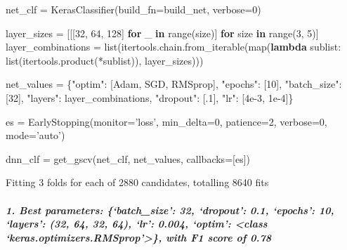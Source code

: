 \documentclass[]{article}
\newenvironment{Shaded}{}{}
\newcommand{\BuiltInTok}[1]{#1}
\newcommand{\ControlFlowTok}[1]{\textcolor[rgb]{0.00,0.44,0.13}{\textbf{#1}}}
\newcommand{\DecValTok}[1]{\textcolor[rgb]{0.25,0.63,0.44}{#1}}
\newcommand{\FloatTok}[1]{\textcolor[rgb]{0.25,0.63,0.44}{#1}}
\newcommand{\KeywordTok}[1]{\textcolor[rgb]{0.00,0.44,0.13}{\textbf{#1}}}
\newcommand{\NormalTok}[1]{#1}
\newcommand{\OperatorTok}[1]{\textcolor[rgb]{0.40,0.40,0.40}{#1}}
\newcommand{\StringTok}[1]{\textcolor[rgb]{0.25,0.44,0.63}{#1}}
\let\oldsubparagraph\subparagraph
\renewcommand{\subparagraph}[1]{\oldsubparagraph{#1}\mbox{}}
\begin{document}
\begin{Shaded}
\begin{Highlighting}[]
\NormalTok{net_clf }\OperatorTok{=}\NormalTok{ KerasClassifier(build_fn}\OperatorTok{=}\NormalTok{build_net, verbose}\OperatorTok{=}\DecValTok{0}\NormalTok{)}

\NormalTok{layer_sizes }\OperatorTok{=}\NormalTok{ [[[}\DecValTok{32}\NormalTok{, }\DecValTok{64}\NormalTok{, }\DecValTok{128}\NormalTok{] }\ControlFlowTok{for}\NormalTok{ _ }\KeywordTok{in} \BuiltInTok{range}\NormalTok{(size)] }\ControlFlowTok{for}\NormalTok{ size }\KeywordTok{in} \BuiltInTok{range}\NormalTok{(}\DecValTok{3}\NormalTok{, }\DecValTok{5}\NormalTok{)]}
\NormalTok{layer_combinations }\OperatorTok{=} \BuiltInTok{list}\NormalTok{(itertools.chain.from_iterable(}\BuiltInTok{map}\NormalTok{(}\KeywordTok{lambda}\NormalTok{ sublist: }\BuiltInTok{list}\NormalTok{(itertools.product(}\OperatorTok{*}\NormalTok{sublist)), layer_sizes)))}

\NormalTok{net_values }\OperatorTok{=}\NormalTok{ \{}\StringTok{"optim"}\NormalTok{: [Adam, SGD, RMSprop], }\StringTok{"epochs"}\NormalTok{: [}\DecValTok{10}\NormalTok{], }\StringTok{"batch_size"}\NormalTok{: [}\DecValTok{32}\NormalTok{], }\StringTok{"layers"}\NormalTok{: layer_combinations, }\StringTok{"dropout"}\NormalTok{: [.}\DecValTok{1}\NormalTok{], }\StringTok{"lr"}\NormalTok{: [}\FloatTok{4e-3}\NormalTok{, }\FloatTok{1e-4}\NormalTok{]\}}

\NormalTok{es }\OperatorTok{=}\NormalTok{ EarlyStopping(monitor}\OperatorTok{=}\StringTok{'loss'}\NormalTok{, min_delta}\OperatorTok{=}\DecValTok{0}\NormalTok{, patience}\OperatorTok{=}\DecValTok{2}\NormalTok{, verbose}\OperatorTok{=}\DecValTok{0}\NormalTok{, mode}\OperatorTok{=}\StringTok{'auto'}\NormalTok{)}

\NormalTok{dnn_clf }\OperatorTok{=}\NormalTok{ get_gscv(net_clf, net_values, callbacks}\OperatorTok{=}\NormalTok{[es])}
\end{Highlighting}
\end{Shaded}

Fitting 3 folds for each of 2880 candidates, totalling 8640 fits

\hypertarget{best-parameters-batch_size-32-dropout-0.1-epochs-10-layers-32-64-32-64-lr-0.004-optim-class-keras.optimizers.rmsprop-with-f1-score-of-0.78}{%
\subparagraph{1. Best parameters: \{`batch\_size': 32, `dropout': 0.1,
`epochs': 10, `layers': (32, 64, 32, 64), `lr': 0.004, `optim':
\textless{}class `keras.optimizers.RMSprop'\textgreater{}\}, with F1
score of
0.78}\label{best-parameters-batch_size-32-dropout-0.1-epochs-10-layers-32-64-32-64-lr-0.004-optim-class-keras.optimizers.rmsprop-with-f1-score-of-0.78}}
\end{document}
